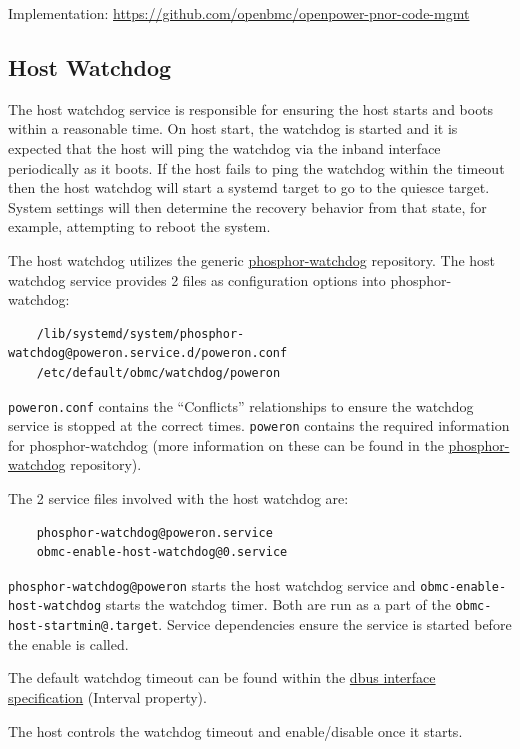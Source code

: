 Implementation:
\url{https://github.com/openbmc/openpower-pnor-code-mgmt}

\hypertarget{host-watchdog}{%
\subsection{Host Watchdog}\label{host-watchdog}}

The host watchdog service is responsible for ensuring the host starts
and boots within a reasonable time. On host start, the watchdog is
started and it is expected that the host will ping the watchdog via the
inband interface periodically as it boots. If the host fails to ping the
watchdog within the timeout then the host watchdog will start a systemd
target to go to the quiesce target. System settings will then determine
the recovery behavior from that state, for example, attempting to reboot
the system.

The host watchdog utilizes the generic
\href{https://github.com/openbmc/phosphor-watchdog}{phosphor-watchdog}
repository. The host watchdog service provides 2 files as configuration
options into phosphor-watchdog:

\begin{verbatim}
    /lib/systemd/system/phosphor-watchdog@poweron.service.d/poweron.conf
    /etc/default/obmc/watchdog/poweron
\end{verbatim}

\texttt{poweron.conf} contains the ``Conflicts'' relationships to ensure
the watchdog service is stopped at the correct times. \texttt{poweron}
contains the required information for phosphor-watchdog (more
information on these can be found in the
\href{https://github.com/openbmc/phosphor-watchdog}{phosphor-watchdog}
repository).

The 2 service files involved with the host watchdog are:

\begin{verbatim}
    phosphor-watchdog@poweron.service
    obmc-enable-host-watchdog@0.service
\end{verbatim}

\texttt{phosphor-watchdog@poweron} starts the host watchdog service and
\texttt{obmc-enable-host-watchdog} starts the watchdog timer. Both are
run as a part of the \texttt{obmc-host-startmin@.target}. Service
dependencies ensure the service is started before the enable is called.

The default watchdog timeout can be found within the
\href{https://github.com/openbmc/phosphor-dbus-interfaces/blob/master/yaml/xyz/openbmc_project/State/Watchdog.interface.yaml}{dbus
interface specification} (Interval property).

The host controls the watchdog timeout and enable/disable once it
starts.
